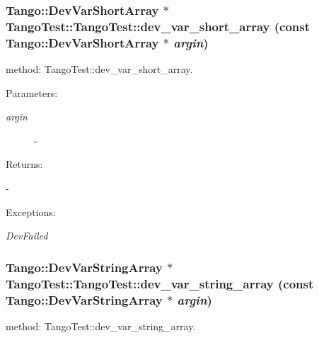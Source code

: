 \subsubsection{\setlength{\rightskip}{0pt plus 5cm}Tango::Dev\-Var\-Short\-Array $\ast$ Tango\-Test::Tango\-Test::dev\_\-var\_\-short\_\-array (const Tango::Dev\-Var\-Short\-Array $\ast$ {\em argin})}\label{classTangoTest_1_1TangoTest_z5_13}


method: Tango\-Test::dev\_\-var\_\-short\_\-array.

\begin{Desc}
\item[Parameters: ]\par
\begin{description}
\item[{\em 
argin}]- \end{description}
\end{Desc}
\begin{Desc}
\item[Returns: ]\par
- \end{Desc}
\begin{Desc}
\item[Exceptions: ]\par
\begin{description}
\item[{\em 
Dev\-Failed}] \end{description}
\end{Desc}
\subsubsection{\setlength{\rightskip}{0pt plus 5cm}Tango::Dev\-Var\-String\-Array $\ast$ Tango\-Test::Tango\-Test::dev\_\-var\_\-string\_\-array (const Tango::Dev\-Var\-String\-Array $\ast$ {\em argin})}\label{classTangoTest_1_1TangoTest_z5_19}


method: Tango\-Test::dev\_\-var\_\-string\_\-array.

